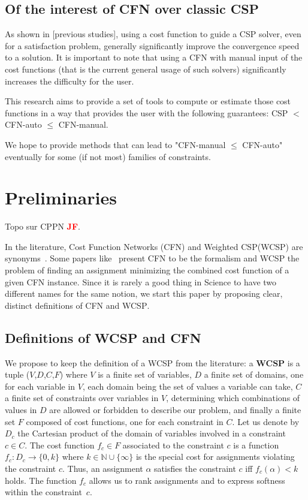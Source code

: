 \documentclass{article}
\newcommand{\csp}{\textsc{CSP}\xspace}
\newcommand{\cfn}{\textsc{CFN}\xspace}
\newcommand{\wcsp}{\textsc{WCSP}\xspace}
\newcommand{\jf}{\textcolor{red}{\bf JF}\xspace}
\begin{document}
\subsection{Of the interest of \cfn over classic CSP}
As shown in  [previous studies], using a cost function to guide a CSP solver, even for a satisfaction problem, generally significantly improve the convergence speed to a solution.  It is important to note that using a \cfn with manual input of  the cost functions (that  is the current
general usage of such solvers) significantly increases the difficulty for the user.

This research aims to provide a set of tools to compute or estimate those cost functions in a  way that provides the user with the following guarantees: CSP $<$ CFN-auto $\leq$ CFN-manual.

We hope to provide methods that can lead to "CFN-manual $\leq$ CFN-auto"  eventually for some (if not most) families of constraints.

\section{Preliminaries}\label{sec:preliminaries}
Topo sur CPPN \jf \cite{CPPN}.

In the  literature, Cost  Function Networks  (\cfn) and  Weighted \csp (\wcsp)  are  synonyms~\cite{Zytnicki2009,Bessiere2011}.  Some papers like~\cite{Allouche2012} present  \cfn to be the formalism and \wcsp the problem of finding an assignment minimizing the combined cost function of a given \cfn instance. Since it is rarely a good thing in Science to have two different names for the same notion, we start this paper by proposing clear, distinct definitions of \cfn and \wcsp.

\subsection{Definitions of \wcsp and \cfn} 

We propose to keep the definition of a \wcsp from the literature: a \textbf{\wcsp} is a tuple ($V$,$D$,$C$,$F$) where $V$ is a finite set of variables, $D$ a finite set of domains, one for each variable in $V$, each domain being the set of values a variable can take, $C$ a finite set of constraints over variables in $V$, determining which combinations of values in $D$ are allowed or forbidden to describe our problem, and finally a finite set $F$ composed of cost functions, one for each constraint in $C$. Let us denote by $D_c$ the Cartesian product of the domain of variables involved in a constraint $c \in C$. The cost function $f_c \in F$ associated to the constraint $c$ is a function $f_c: D_c \rightarrow \{0,k\}$ where $k \in \mathbb{N} \cup \{\infty\}$ is the special cost for assignments violating the constraint $c$. Thus, an assignment $\alpha$ satisfies the constraint $c$ iff $f_c(\alpha) < k$ holds. The function $f_c$ allows us to rank assignments and to express softness within the constraint~$c$.
\end{document}
